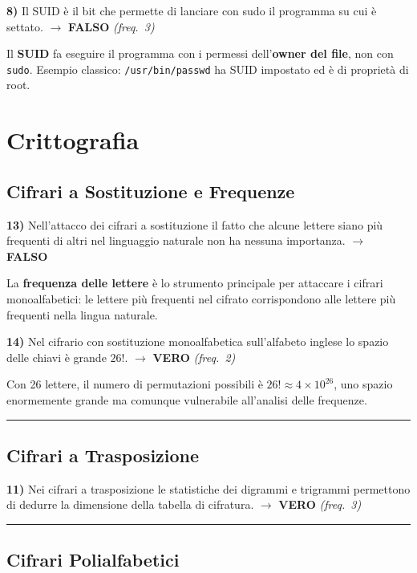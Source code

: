 \documentclass[12pt, a4paper]{report}
\newcommand{\vero}{\textcolor{verdeanswer}{\textbf{VERO}}}
\newcommand{\falso}{\textcolor{rossoanswer}{\textbf{FALSO}}}
\newcommand{\freq}[1]{\textcolor{freqcolor}{\textit{(freq.\ #1)}}}
\begin{document}
\medskip
\noindent\textbf{8)} Il SUID è il bit che permette di lanciare con sudo il programma su cui è settato. $\to$ \falso{} \freq{3}

\medskip
\noindent Il \textbf{SUID} fa eseguire il programma con i permessi dell'\textbf{owner del file}, non con \texttt{sudo}. Esempio classico: \texttt{/usr/bin/passwd} ha SUID impostato ed è di proprietà di root.

\chapter{Crittografia}

\section{Cifrari a Sostituzione e Frequenze}

\noindent\textbf{13)} Nell'attacco dei cifrari a sostituzione il fatto che alcune lettere siano più frequenti di altri nel linguaggio naturale non ha nessuna importanza. $\to$ \falso{}

\medskip
\noindent La \textbf{frequenza delle lettere} è lo strumento principale per attaccare i cifrari monoalfabetici: le lettere più frequenti nel cifrato corrispondono alle lettere più frequenti nella lingua naturale.

\medskip
\noindent\textbf{14)} Nel cifrario con sostituzione monoalfabetica sull'alfabeto inglese lo spazio delle chiavi è grande $26!$. $\to$ \vero{} \freq{2}

\medskip
\noindent Con 26 lettere, il numero di permutazioni possibili è $26! \approx 4 \times 10^{26}$, uno spazio enormemente grande ma comunque vulnerabile all'analisi delle frequenze.

\noindent\rule{\textwidth}{0.4pt}

\section{Cifrari a Trasposizione}

\noindent\textbf{11)} Nei cifrari a trasposizione le statistiche dei digrammi e trigrammi permettono di dedurre la dimensione della tabella di cifratura. $\to$ \vero{} \freq{3}

\noindent\rule{\textwidth}{0.4pt}

\section{Cifrari Polialfabetici}
\end{document}
